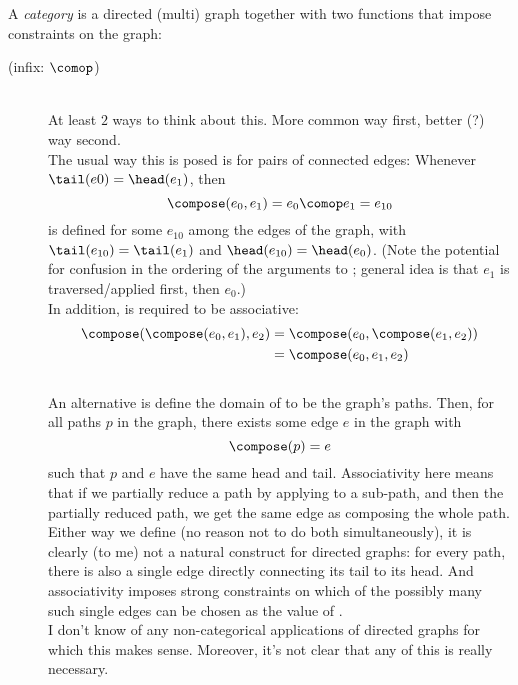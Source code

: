 \documentclass[11pt,openany]{book}
\begin{document}
\begin{definition}
A \textit{category} is a directed (multi) graph 
together with two functions that impose constraints
on the graph:
\begin{description}
\item[\compose \textrm{\textup{(infix: $\comop$)}}]\mbox{}\\
At least $2$ ways to think about this. 
More common way first, better (?) way second.\\
The usual way this is posed is for pairs of connected edges:
Whenever $\tail(e0) = \head(e_1)$,
then
\[ \compose(e_0,e_1) = e_0 \comop e_1 = e_{10} \]
is defined
for some $e_{10}$ among the edges of the graph,
with $\tail(e_{10}) = \tail(e_1)$
and $\head(e_{10}) = \head(e_0)$.
(Note the potential for confusion 
in the ordering of the arguments to \compose;
general idea is that $e_1$ is traversed/applied first,
then $e_0$.) \\
In addition, \compose is required to be associative:
\begin{align*}
\compose(\compose(e_0,e_1),e_2) 
&
= \compose(e_0,\compose(e_1,e_2))
\\
&
= \compose(e_0,e_1,e_2)
\end{align*}
\\
An alternative is define the domain of \compose
to be the graph's paths. 
Then, for all paths $p$ in the graph,
there exists some edge $e$ in the graph
with 
\begin{equation*}
\compose(p) = e
\end{equation*} 
such that 
$p$ and $e$ have the same head and tail.
Associativity here means that if we partially reduce a path
by applying \compose to a sub-path,
and then \compose the partially reduced path,
we get the same edge as composing the whole path.
\\
Either way we define \compose (no reason not to do both
simultaneously), it is clearly (to me) not a natural construct
for directed graphs: for every path, there is also 
a single edge directly connecting its tail to its head.
And associativity imposes strong constraints on which of the possibly
many such single edges can be chosen as the value of \compose.
\\
I don't know of any non-categorical applications of directed graphs
for which this makes sense.
Moreover, it's not clear that any of this is really necessary.
\\
\item[\identity]\mbox{}\\

\end{description}
\end{definition}
\end{document}
